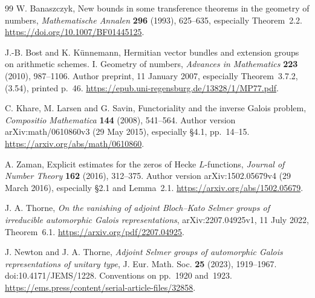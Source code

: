\documentclass[11pt,a4paper]{article}
\theoremstyle{remark}
\begin{document}
\begin{thebibliography}{99}
W. Banaszczyk, New bounds in some transference theorems
in the geometry of numbers,
\emph{Mathematische Annalen} \textbf{296} (1993), 625--635,
especially Theorem~2.2.
\url{https://doi.org/10.1007/BF01445125}.

J.-B. Bost and K. K\"unnemann,
Hermitian vector bundles and extension groups on arithmetic
schemes. I. Geometry of numbers,
\emph{Advances in Mathematics} \textbf{223} (2010), 987--1106.
Author preprint, 11 January 2007, especially
Theorem~3.7.2, (3.54), printed p.~46.
\url{https://epub.uni-regensburg.de/13828/1/MP77.pdf}.

C. Khare, M. Larsen and G. Savin,
Functoriality and the inverse Galois problem,
\emph{Compositio Mathematica} \textbf{144} (2008), 541--564.
Author version arXiv:math/0610860v3 (29 May 2015),
especially \S4.1, pp.~14--15.
\url{https://arxiv.org/abs/math/0610860}.

A. Zaman, Explicit estimates for the zeros of Hecke
\(L\)-functions,
\emph{Journal of Number Theory} \textbf{162} (2016), 312--375.
Author version arXiv:1502.05679v4 (29 March 2016),
especially \S2.1 and Lemma~2.1.
\url{https://arxiv.org/abs/1502.05679}.

J. A. Thorne, \emph{On the vanishing of adjoint Bloch--Kato
Selmer groups of irreducible automorphic Galois representations},
arXiv:2207.04925v1, 11 July 2022, Theorem~6.1.
\url{https://arxiv.org/pdf/2207.04925}.

J. Newton and J. A. Thorne, \emph{Adjoint Selmer groups of
automorphic Galois representations of unitary type},
J. Eur. Math. Soc. \textbf{25} (2023), 1919--1967.
doi:10.4171/JEMS/1228. Conventions on pp.~1920 and~1923.
\url{https://ems.press/content/serial-article-files/32858}.

\end{thebibliography}
\end{document}
